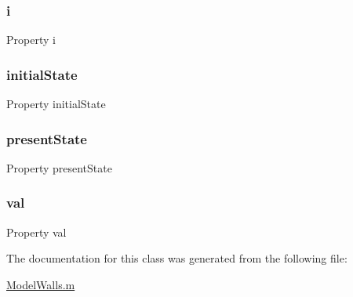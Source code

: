 \subsubsection{\texorpdfstring{i}{i}}
{\footnotesize\ttfamily Property i}

\mbox{\label{class_model_walls_acd9263acfa96c9138afdf497e55acc24}} 
\subsubsection{\texorpdfstring{initial\+State}{initialState}}
{\footnotesize\ttfamily Property initial\+State}

\mbox{\label{class_model_walls_a9624cc7c421a50fa5086b0ebd0cd5fe3}} 
\subsubsection{\texorpdfstring{present\+State}{presentState}}
{\footnotesize\ttfamily Property present\+State}

\mbox{\label{class_model_walls_aae3a423b8c844683e2adba0472347fe1}} 
\subsubsection{\texorpdfstring{val}{val}}
{\footnotesize\ttfamily Property val}



The documentation for this class was generated from the following file\+:\begin{DoxyCompactItemize}
\item 
\hyperlink{_model_walls_8m}{Model\+Walls.\+m}\end{DoxyCompactItemize}
